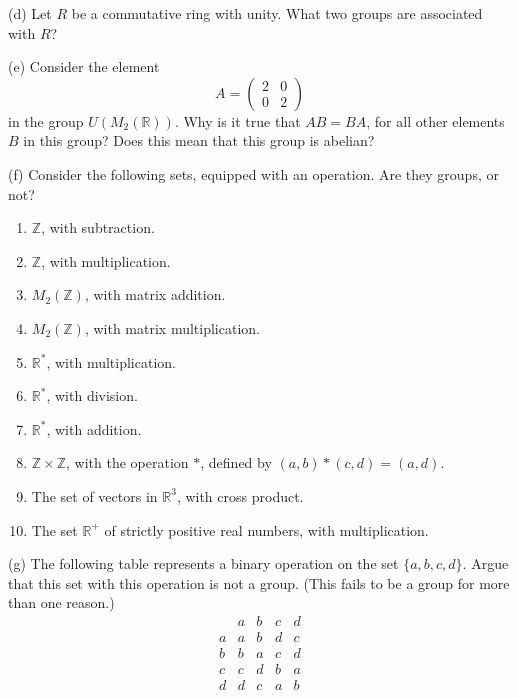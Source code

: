 \begin{problem}[Warmup]{(d)}
    Let $R$ be a commutative ring with unity. What two groups are associated with $R$?
\end{problem}
\unsolved

\begin{problem}[Warmup]{(e)}
    Consider the element \[A = \begin{pmatrix} 2 & 0 \\ 0 & 2 \end{pmatrix}\] in the group $U(M_2(\mathbb{R}))$. Why is it true that $AB = BA$, for all other elements $B$ in this group? Does this mean that this group is abelian?
\end{problem}
\unsolved

\begin{problem}[Warmup]{(f)}
    Consider the following sets, equipped with an operation. Are they groups, or not?
    \begin{enumerate}
        \item[(a)] $\mathbb{Z}$, with subtraction.
        \item[(b)] $\mathbb{Z}$, with multiplication.
        \item[(c)] $M_2(\mathbb{Z})$, with matrix addition.
        \item[(d)] $M_2(\mathbb{Z})$, with matrix multiplication.
        \item[(e)] $\mathbb{R}^*$, with multiplication.
        \item[(f)] $\mathbb{R}^*$, with division.
        \item[(g)] $\mathbb{R}^*$, with addition.
        \item[(h)] $\mathbb{Z} \times \mathbb{Z}$, with the operation $*$, defined by $(a, b) * (c, d) = (a, d)$.
        \item[(i)] The set of vectors in $\mathbb{R}^3$, with cross product.
        \item[(j)] The set $\mathbb{R}^+$ of strictly positive real numbers, with multiplication.
    \end{enumerate}
\end{problem}
\unsolved

\begin{problem}[Warmup]{(g)}
    The following table represents a binary operation on the set $\{a, b, c, d\}$. Argue that this set with this operation is not a group. (This fails to be a group for more than one reason.) \[\begin{array}{c|cccc} & a & b & c & d \\ \hline a & a & b & d & c \\ b & b & a & c & d \\ c & c & d & b & a \\ d & d & c & a & b \end{array}\]
\end{problem}
\unsolved


